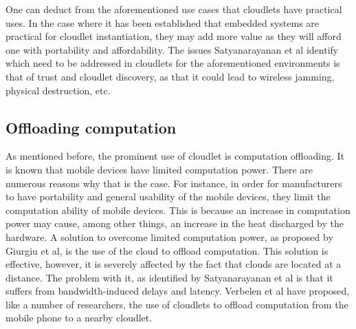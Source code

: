 \noindent One can deduct from the aforementioned use cases that cloudlets have practical uses. In the case where it has been established that embedded systems are practical for cloudlet instantiation, they may add more value as they will afford one with portability and affordability. The issues Satyanarayanan et al\cite{RefWorks:107} identify which need to be addressed in cloudlets for the aforementioned environments is that of trust and cloudlet discovery, as that it could lead to wireless jamming, physical destruction, etc.

\subsection{Offloading computation}

As mentioned before, the prominent use of cloudlet is computation offloading. It is known that mobile devices have limited computation power. There are numerous reasons why that is the case.
For instance, in order for manufacturers to have portability and general usability of the mobile devices, they limit the computation ability of mobile devices. This is because an increase in
computation power may cause, among other things, an increase in the heat discharged by the hardware. A solution to overcome limited computation power, as proposed by Giurgiu et al\cite{giurgiu2009calling},
is the use of the cloud to offload computation. This solution is effective, however, it is severely affected by the fact that clouds are located at a distance. The problem with it, as
identified by Satyanarayanan et al\cite{satyanarayanan2009case} is that it suffers from bandwidth-induced delays and latency. Verbelen et al\cite{RefWorks:93} have proposed, like a number of
researchers, the use of cloudlets to offload computation from the mobile phone to a nearby cloudlet.\newline

